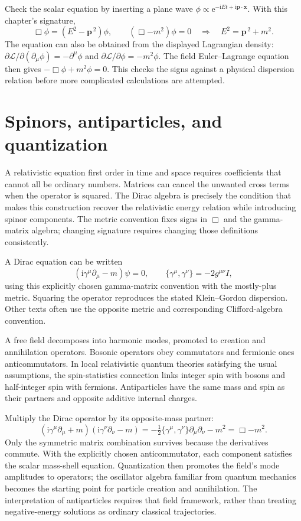\documentclass[11pt,oneside]{book}
\newcommand{\ii}{\mathrm{i}}
\newcommand{\ee}{\mathrm{e}}
\newcommand{\vect}[1]{\boldsymbol{#1}}
\theoremstyle{reviewstyle}
\begin{document}
Check the scalar equation by inserting a plane wave $\phi\propto\ee^{-\ii Et+\ii\vect p\cdot\vect x}$. With this chapter's signature,
\begin{equation}
\Box\phi=(E^2-\vect p^{\,2})\phi,
\qquad (\Box-m^2)\phi=0
\quad\Longrightarrow\quad E^2=\vect p^{\,2}+m^2.
\end{equation}
The equation can also be obtained from the displayed Lagrangian density: $\partial\mathcal L/\partial(\partial_\mu\phi)=-\partial^\mu\phi$ and $\partial\mathcal L/\partial\phi=-m^2\phi$. The field Euler--Lagrange equation then gives $-\Box\phi+m^2\phi=0$. This checks the signs against a physical dispersion relation before more complicated calculations are attempted.

\section{Spinors, antiparticles, and quantization}
A relativistic equation first order in time and space requires coefficients that cannot all be ordinary numbers. Matrices can cancel the unwanted cross terms when the operator is squared. The Dirac algebra is precisely the condition that makes this construction recover the relativistic energy relation while introducing spinor components. The metric convention fixes signs in $\Box$ and the gamma-matrix algebra; changing signature requires changing those definitions consistently.

A Dirac equation can be written
\begin{equation}(\ii\gamma^\mu\partial_\mu-m)\psi=0,\qquad \{\gamma^\mu,\gamma^\nu\}=-2g^{\mu\nu}I,\end{equation}
using this explicitly chosen gamma-matrix convention with the mostly-plus metric. Squaring the operator reproduces the stated Klein--Gordon dispersion. Other texts often use the opposite metric and corresponding Clifford-algebra convention.

A free field decomposes into harmonic modes, promoted to creation and annihilation operators. Bosonic operators obey commutators and fermionic ones anticommutators. In local relativistic quantum theories satisfying the usual assumptions, the spin-statistics connection links integer spin with bosons and half-integer spin with fermions. Antiparticles have the same mass and spin as their partners and opposite additive internal charges.

Multiply the Dirac operator by its opposite-mass partner:
\begin{equation}
(\ii\gamma^\mu\partial_\mu+m)(\ii\gamma^\nu\partial_\nu-m)
=-\tfrac12\{\gamma^\mu,\gamma^\nu\}\partial_\mu\partial_\nu-m^2
=\Box-m^2.
\end{equation}
Only the symmetric matrix combination survives because the derivatives commute. With the explicitly chosen anticommutator, each component satisfies the scalar mass-shell equation. Quantization then promotes the field's mode amplitudes to operators; the oscillator algebra familiar from quantum mechanics becomes the starting point for particle creation and annihilation. The interpretation of antiparticles requires that field framework, rather than treating negative-energy solutions as ordinary classical trajectories.
\end{document}
